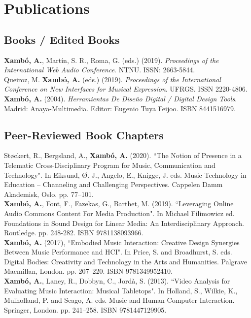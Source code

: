 \documentclass[10pt, a4paper]{article}
\newcommand{\years}[1]{\marginnote{\scriptsize #1}}
\begin{document}
\section*{Publications}

\subsection*{Books / Edited Books}
\noindent

\years{2020}\textbf{Xambó, A.},  Martín, S. R., Roma, G. (eds.) (2019). \emph{Proceedings of the International Web Audio Conference}. NTNU. ISSN: 2663-5844.\\
\years{2019}Queiroz, M. \textbf{Xambó, A.} (eds.) (2019). \emph{Proceedings of the International Conference on New Interfaces for Musical Expression}. UFRGS. ISSN 2220-4806.\\
\years{2004}\textbf{Xambó, A.} (2004). \emph{Herramientas De Diseño Digital / Digital Design Tools}. Madrid: Anaya-Multimedia. Editor: Eugenio Tuya Feijoo. ISBN 8441516979.

\subsection*{Peer-Reviewed Book Chapters}
\noindent

\years{2020}Støckert, R., Bergsland, A., \textbf{Xambó, A.} (2020). “The Notion of Presence in a Telematic Cross-Disciplinary Program for Music, Communication and Technology". In Eiksund, Ø. J., Angelo, E., Knigge, J. eds. Music Technology in Education -- Channeling and Challenging Perspectives. Cappelen Damm Akademisk, Oslo. pp. 77--101.\\
\years{2019}\textbf{Xambó, A.}, Font, F., Fazekas, G., Barthet, M. (2019). “Leveraging Online Audio Commons Content For Media Production". In Michael Filimowicz ed. Foundations in Sound Design for Linear Media: An Interdisciplinary Approach. Routledge. pp. 248-282. ISBN 9781138093966.\\
\years{2016}\textbf{Xambó, A.} (2017), “Embodied Music Interaction: Creative Design Synergies Between Music Performance and HCI". In Price, S. and Broadhurst, S. eds. Digital Bodies: Creativity and Technology in the Arts and Humanities. Palgrave Macmillan, London. pp. 207--220. ISBN 9781349952410.\\
\years{2013}\textbf{Xambó, A.}, Laney, R., Dobbyn, C., Jordà, S. (2013). “Video Analysis for Evaluating Music Interaction: Musical Tabletops". In Holland, S., Wilkie, K., Mulholland, P. and Seago, A. eds. Music and Human-Computer Interaction. Springer, London. pp. 241--258. ISBN 9781447129905.
\end{document}
